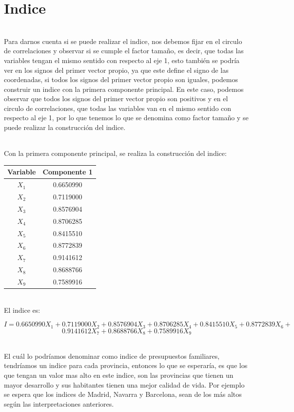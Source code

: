 \documentclass[report,oneside]{revcoles}
\begin{document}
\section{Indice}
~\\Para darnos cuenta si se puede realizar el indice, nos debemos fijar en el circulo de correlaciones y observar si se cumple el factor tamaño, es decir, que todas las variables tengan el mismo sentido con respecto al eje 1, esto también se podría ver en los signos del primer vector propio, ya que este define el signo de las coordenadas, si todos los signos del primer vector propio son iguales, podemos construir un indice con la primera componente principal. En este caso, podemos observar que todos los signos del primer vector propio son positivos y en el circulo de correlaciones, que todas las variables van en el mismo sentido con respecto al eje 1, por lo que tenemos lo que se denomina como factor tamaño y se puede realizar la construcción del indice.

~\\Con la primera componente principal, se realiza la construcción del indice:

\begin{center}
\begin{tabular}{|c|c|}
\hline 
Variable & Componente 1 \\ 
\hline 
$X_1$ & 0.6650990 \\ 
$X_2$ & 0.7119000 \\  
$X_3$ & 0.8576904 \\ 
$X_4$ & 0.8706285 \\ 
$X_5$ & 0.8415510 \\ 
$X_6$ & 0.8772839 \\ 
$X_7$ & 0.9141612 \\  
$X_8$ & 0.8688766 \\ 
$X_9$ & 0.7589916 \\ 
\hline 
\end{tabular} 
\end{center}

~\\El indice es:

$$I=0.6650990 X_1 +0.7119000 X_2 + 0.8576904 X_3 + 0.8706285 X_4 + 0.8415510 X_5+ 0.8772839 X_6 +$$
$$0.9141612 X_7 + 0.8688766 X_8 + 0.7589916 X_9$$

~\\El cuál lo podríamos denominar como indice de presupuestos familiares, tendríamos un indice para cada provincia, entonces lo que se esperaría, es que los que tengan un valor mas alto en este indice, son las provincias  que tienen un mayor desarrollo y sus habitantes tienen una mejor calidad de vida. Por ejemplo se espera que los indices de Madrid, Navarra y Barcelona, sean de los más altos según las interpretaciones anteriores.
\end{document}
